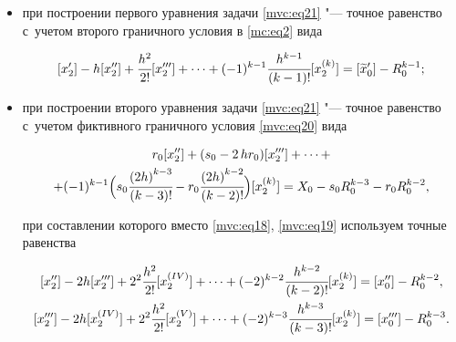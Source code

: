 \begin{itemize}

\item[а)] при построении первого уравнения задачи  \eqref{mvc:eq21} "--- точное равенство с~учетом второго граничного условия в \eqref{mc:eq2} вида

\begin{equation}

\label{mvc:eq32}

  [x_2']-h [x''_2]+\cfrac{h^{2}}{2!} [x_{2}''']+\dots+(-1)^{k-1}\cfrac{h^{k-1}}{(k-1)!} [x_2^{(k)}]=[\widetilde{x}_0']-R_{0}^{k-1};

\end{equation}





\item[б)] при построении второго уравнения задачи  \eqref{mvc:eq21} "--- точное равенство с~учетом фиктивного граничного условия  \eqref{mvc:eq20} вида

\begin{multline}

\label{mvc:eq35}

  r_0[x_2'']+(s_0-2\,hr_0)[x'''_2]+\dots+ \\ +

(-1)^{k-1}\Bigl(s_0 \cfrac{{(2h)}^{k-3}}{(k-3)!}-r_0 \cfrac{{(2h)}^{k-2}}{(k-2)!}\Bigr)[x_{2}^{(k)}]=

X_0-s_0R_{0}^{k-3}-r_0R_{0}^{k-2},

\end{multline}

при составлении которого вместо \eqref{mvc:eq18}, \eqref{mvc:eq19} используем точные равенства

\begin{gather}

\label{mvc:eq33}

[x_2'']-2 h [x'''_2]+2^2 \cfrac{h^{2}}{2!} 

[x_{2}^{(IV)}]+\dots+(-2)^{k-2}\cfrac{h^{k-2}}{{(k-2)}!} [x_2^{(k)}]=[x_0'']-R_{0}^{k-2},

\\

\label{mvc:eq34}

[x_2''']-2 h [x_2^{(IV)}]+2^2 \cfrac{h^{2}}{2!} [x_{2}^{(V)}]+\dots+(-2)^{k-3}\cfrac{h^{k-3}}{{(k-3)}!} [x_2^{(k)}]=[x_0''']-R_{0}^{k-3}.

\end{gather}



\end{itemize} 



